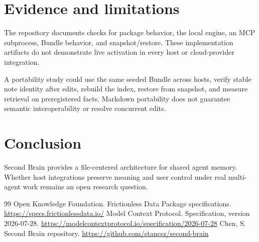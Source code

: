 \documentclass[11pt]{article}
\begin{document}
\section{Evidence and limitations}
The repository documents \cite{r3} checks for package behavior, the local engine, an MCP subprocess, Bundle behavior, and snapshot/restore. These implementation artifacts do not demonstrate live activation in every host or cloud-provider integration.\par
A portability study could use the same seeded Bundle across hosts, verify stable note identity after edits, rebuild the index, restore from snapshot, and measure retrieval on preregistered facts. Markdown portability does not guarantee semantic interoperability or resolve concurrent edits.\par
\section{Conclusion}
Second Brain provides a file-centered architecture for shared agent memory. Whether host integrations preserve meaning and user control under real multi-agent work remains an open research question.\par
\begin{thebibliography}{99}
 Open Knowledge Foundation. Frictionless Data Package specifications. \url{https://specs.frictionlessdata.io/}
 Model Context Protocol. Specification, version 2026-07-28. \url{https://modelcontextprotocol.io/specification/2026-07-28}
 Chen, S. Second Brain repository. \url{https://github.com/stancsz/second-brain}
\end{thebibliography}
\end{document}
